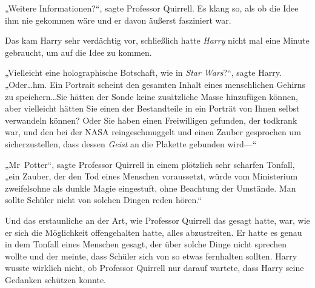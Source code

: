 „Weitere Informationen?“, sagte Professor Quirrell. Es klang so, als ob die Idee ihm nie gekommen wäre und er davon äußerst fasziniert war.

Das kam Harry sehr verdächtig vor, schließlich hatte \emph{Harry} nicht mal eine Minute gebraucht, um auf die Idee zu kommen.

„Vielleicht eine holographische Botschaft, wie in \emph{Star Wars}?“, sagte Harry. „Oder…hm. Ein Portrait scheint den gesamten Inhalt eines menschlichen Gehirns zu speichern…Sie hätten der Sonde keine zusätzliche Masse hinzufügen können, aber vielleicht hätten Sie einen der Bestandteile in ein Porträt von Ihnen selbst verwandeln können? Oder Sie haben einen Freiwilligen gefunden, der todkrank war, und den bei der NASA reingeschmuggelt und einen Zauber gesprochen um sicherzustellen, dass dessen \emph{Geist} an die Plakette gebunden wird—“

„Mr~Potter“, sagte Professor Quirrell in einem plötzlich sehr scharfen Tonfall, „ein Zauber, der den Tod eines Menschen voraussetzt, würde vom Ministerium zweifelsohne als dunkle Magie eingestuft, ohne Beachtung der Umstände. Man sollte Schüler nicht von solchen Dingen reden hören.“

Und das erstaunliche an der Art, wie Professor Quirrell das gesagt hatte, war, wie er sich die Möglichkeit offengehalten hatte, alles abzustreiten. Er hatte es genau in dem Tonfall eines Menschen gesagt, der über solche Dinge nicht sprechen wollte und der meinte, dass Schüler sich von so etwas fernhalten sollten. Harry wusste wirklich nicht, ob Professor Quirrell nur darauf wartete, dass Harry seine Gedanken schützen konnte.

